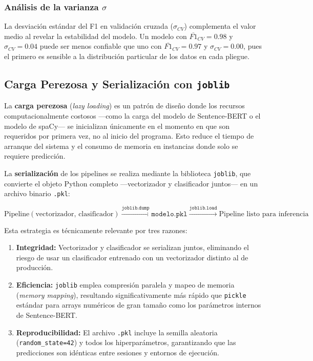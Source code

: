 \subsubsection*{Análisis de la varianza $\sigma$}

La desviación estándar del F1 en validación cruzada ($\sigma_{CV}$) complementa
el valor medio al revelar la estabilidad del modelo. Un modelo con
$\overline{F1}_{CV} = 0.98$ y $\sigma_{CV} = 0.04$ puede ser menos confiable
que uno con $\overline{F1}_{CV} = 0.97$ y $\sigma_{CV} = 0.00$, pues el
primero es sensible a la distribución particular de los datos en cada pliegue.

\subsection{Carga Perezosa y Serialización con \texttt{joblib}}

La \textbf{carga perezosa} (\textit{lazy loading}) es un patrón de diseño donde
los recursos computacionalmente costosos —como la carga del modelo de Sentence-BERT
o el modelo de spaCy— se inicializan únicamente en el momento en que son
requeridos por primera vez, no al inicio del programa. Esto reduce el tiempo
de arranque del sistema y el consumo de memoria en instancias donde solo se
requiere predicción.

La \textbf{serialización} de los pipelines se realiza mediante la biblioteca
\texttt{joblib}, que convierte el objeto Python completo —vectorizador y
clasificador juntos— en un archivo binario \texttt{.pkl}:

\begin{equation*}
  \text{Pipeline}(\text{vectorizador},\, \text{clasificador})
  \xrightarrow{\texttt{joblib.dump}}
  \texttt{modelo.pkl}
  \xrightarrow{\texttt{joblib.load}}
  \text{Pipeline listo para inferencia}
\end{equation*}

Esta estrategia es técnicamente relevante por tres razones:

\begin{enumerate}
  \item \textbf{Integridad:} Vectorizador y clasificador se serializan juntos,
        eliminando el riesgo de usar un clasificador entrenado con un
        vectorizador distinto al de producción.
  \item \textbf{Eficiencia:} \texttt{joblib} emplea compresión paralela y
        mapeo de memoria (\textit{memory mapping}), resultando significativamente
        más rápido que \texttt{pickle} estándar para arrays numéricos de gran
        tamaño como los parámetros internos de Sentence-BERT.
  \item \textbf{Reproducibilidad:} El archivo \texttt{.pkl} incluye la semilla
        aleatoria (\texttt{random\_state=42}) y todos los hiperparámetros,
        garantizando que las predicciones son idénticas entre sesiones y
        entornos de ejecución.
\end{enumerate}

